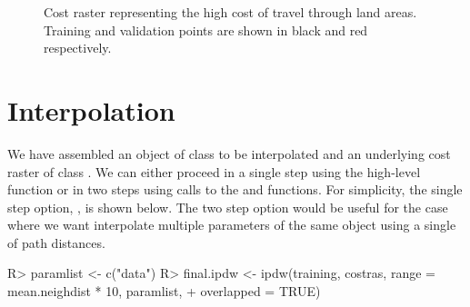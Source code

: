 \documentclass[nojss,shortnames]{jss}
\begin{document}
\begin{figure}[h!]
\begin{center}
\end{center}
\caption{Cost raster representing the high cost of travel through land areas. Training and validation points are shown in black and red respectively.}
\label{fig:zero}
\end{figure}
\FloatBarrier

\section{Interpolation}
We have assembled an object of class  to be interpolated and an underlying cost raster of class . We can either proceed in a single step using the high-level  function  or in two steps using calls to the  and  functions. For simplicity, the single step option, , is shown below. The two step option would be useful for the case where we want interpolate multiple parameters of the same  object using a single  of path distances.


\begin{Schunk}
\begin{Sinput}
R> paramlist <- c("data")
R> final.ipdw <- ipdw(training, costras, range = mean.neighdist * 10, paramlist,
+									 overlapped = TRUE)
\end{Sinput}
\end{Schunk}
\end{document}
